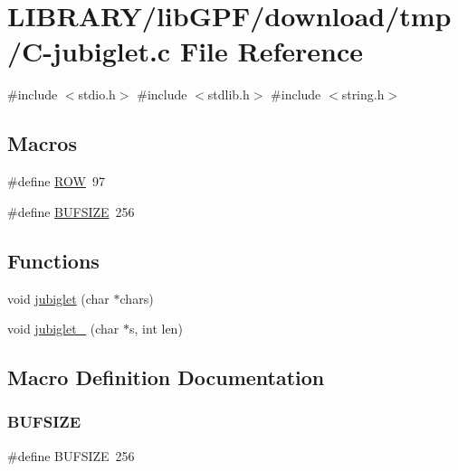 \hypertarget{C-jubiglet_8c}{}\section{L\+I\+B\+R\+A\+R\+Y/lib\+G\+P\+F/download/tmp/\+C-\/jubiglet.c File Reference}
\label{C-jubiglet_8c}
{\ttfamily \#include $<$stdio.\+h$>$}\newline
{\ttfamily \#include $<$stdlib.\+h$>$}\newline
{\ttfamily \#include $<$string.\+h$>$}\newline
\subsection*{Macros}
\begin{DoxyCompactItemize}
\item 
\#define \hyperlink{C-jubiglet_8c_ac6f18a9e1d00b4637522b1b469a92021}{R\+OW}~97
\item 
\#define \hyperlink{C-jubiglet_8c_aeca034f67218340ecb2261a22c2f3dcd}{B\+U\+F\+S\+I\+ZE}~256
\end{DoxyCompactItemize}
\subsection*{Functions}
\begin{DoxyCompactItemize}
\item 
void \hyperlink{C-jubiglet_8c_adc484767e979a59ef703547d98fab384}{jubiglet} (char $\ast$chars)
\item 
void \hyperlink{C-jubiglet_8c_a6a4a6c766aa968996649c44415282c91}{jubiglet\+\_\+} (char $\ast$s, int len)
\end{DoxyCompactItemize}


\subsection{Macro Definition Documentation}
\mbox{\label{C-jubiglet_8c_aeca034f67218340ecb2261a22c2f3dcd}} 
\subsubsection{\texorpdfstring{B\+U\+F\+S\+I\+ZE}{BUFSIZE}}
{\footnotesize\ttfamily \#define B\+U\+F\+S\+I\+ZE~256}

